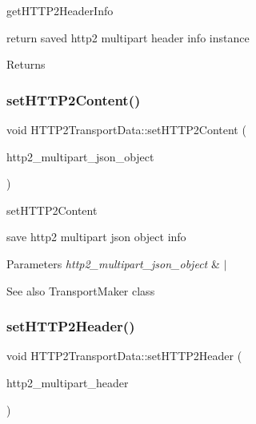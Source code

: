 get\+H\+T\+T\+P2\+Header\+Info 

return saved http2 multipart header info instance \begin{DoxyReturn}{Returns}

\end{DoxyReturn}
\mbox{\label{classhttp2_1_1HTTP2TransportData_a2bb8e379cba530e84eb0516e3680cc5f}} 
\subsubsection{\texorpdfstring{set\+H\+T\+T\+P2\+Content()}{setHTTP2Content()}}
{\footnotesize\ttfamily void H\+T\+T\+P2\+Transport\+Data\+::set\+H\+T\+T\+P2\+Content (\begin{DoxyParamCaption}\item[{\hyperlink{classAlexaEvent_1_1TransportInfo}{Alexa\+Event\+::\+Transport\+Info} $\ast$}]{http2\+\_\+multipart\+\_\+json\+\_\+object }\end{DoxyParamCaption})}



set\+H\+T\+T\+P2\+Content 

save http2 multipart json object info 
\begin{DoxyParams}{Parameters}
{\em http2\+\_\+multipart\+\_\+json\+\_\+object} & $\vert$ \\
\hline
\end{DoxyParams}
\begin{DoxySeeAlso}{See also}
Transport\+Maker class 
\end{DoxySeeAlso}
\mbox{\label{classhttp2_1_1HTTP2TransportData_abbca034874381c8d2bde4af82ad50851}} 
\subsubsection{\texorpdfstring{set\+H\+T\+T\+P2\+Header()}{setHTTP2Header()}}
{\footnotesize\ttfamily void H\+T\+T\+P2\+Transport\+Data\+::set\+H\+T\+T\+P2\+Header (\begin{DoxyParamCaption}\item[{\hyperlink{classAlexaEvent_1_1TransportHeaderInfo}{Alexa\+Event\+::\+Transport\+Header\+Info} $\ast$}]{http2\+\_\+multipart\+\_\+header }\end{DoxyParamCaption})}



